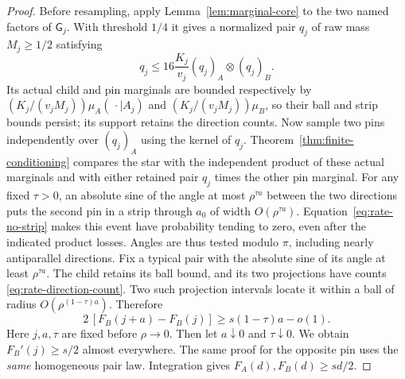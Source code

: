 \begin{proof}
Before resampling, apply Lemma~\ref{lem:marginal-core} to the two named
factors of $\mathsf G_j$.  With threshold $1/4$ it gives a normalized
pair $q_j$ of raw mass $M_j\ge1/2$ satisfying
\[
 q_j\le16\frac{K_j}{v_j}(q_j)_A\otimes(q_j)_B.
\]
Its actual child and pin marginals are bounded respectively by
$(K_j/(v_jM_j))\mu_A(\,\cdot\mid A_j)$ and
$(K_j/(v_jM_j))\mu_B$, so their ball and strip bounds persist; its
support retains the direction counts.  Now sample two pins independently
over $(q_j)_A$ using the kernel of $q_j$.
Theorem~\ref{thm:finite-conditioning} compares the star with the
independent product of these actual marginals
and with either retained pair $q_j$ times the other pin marginal.
For any fixed $\tau>0$, an absolute sine of the angle at most $\rho^{\tau a}$ between
the two directions puts the second pin in a strip through $a_0$ of
width $O(\rho^{\tau a})$. Equation~\eqref{eq:rate-no-strip} makes
this event have probability tending to zero, even after the indicated
product losses. Angles are thus tested modulo $\pi$, including
nearly antiparallel directions. Fix a typical pair with the absolute
sine of its angle at least $\rho^{\tau a}$. The child
retains its ball bound, and its two projections have counts
\eqref{eq:rate-direction-count}. Two such projection intervals locate
it within a ball of radius $O(\rho^{(1-\tau)a})$. Therefore
\[
 2\,[F_B(j+a)-F_B(j)]\ge s(1-\tau)a-o(1).
\]
Here $j,a,\tau$ are fixed before $\rho\to0$. Then let $a\downarrow0$
and $\tau\downarrow0$. We obtain $F_B'(j)\ge s/2$ almost everywhere.
The same proof for the opposite pin uses the \emph{same} homogeneous
pair law. Integration gives $F_A(d),F_B(d)\ge sd/2$.


\end{proof}
